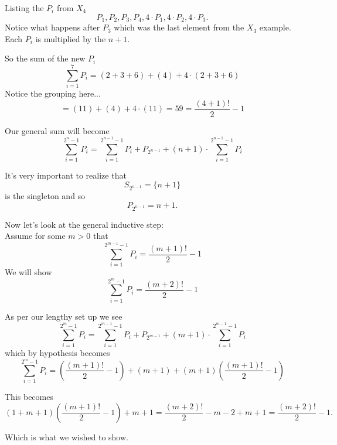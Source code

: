 \documentclass[16 pt]{amsart}
\theoremstyle{definition}
\theoremstyle{remark}
\numberwithin{equation}{section}
\begin{document}
Listing the $P_i$ from $X_4$
\[
P_1,P_2,P_3,P_4,4\cdot P_1, 4\cdot P_2, 4\cdot P_3.
\]
Notice what happens after $P_3$ which was the last element from the $X_3$ example.  Each $P_i$ is multiplied by the $n+1$.

So the sum of the new $P_i$
\[
\sum_{i=1}^{7}P_i = (2+3+6) + (4) + 4\cdot(2+3+6) 
\]
Notice the grouping here...
\[
= (11) + (4) + 4\cdot(11) = 59 = \frac{(4+1)!}{2} -1
\]

Our general sum will become
\[
\sum_{i=1}^{2^n-1}P_i = \sum_{i=1}^{2^{n-1}-1}P_i + P_{2^{n-1}} + (n+1)\cdot \sum_{i=1}^{2^{n-1}-1}P_i
\]

It's very important to realize that
\[
S_{2^{n-1}} = \{n+1\}
\]
is the singleton and so
\[
P_{2^{n-1}} = n+1.
\]

Now let's look at the general inductive step:\\
Assume for some $m>0$ that
\[
\sum_{i=1}^{2^{m-1}-1} P_i = \frac{(m+1)!}{2} - 1
\]
We will show
\[
\sum_{i=1}^{2^{m}-1} P_i = \frac{(m+2)!}{2} - 1
\]

As per our lengthy set up we see
\[
\sum_{i=1}^{2^m-1}P_i = \sum_{i=1}^{2^{m-1}-1}P_i + P_{2^{m-1}} + (m+1)\cdot \sum_{i=1}^{2^{m-1}-1}P_i
\]
which by hypothesis becomes
\[
\sum_{i=1}^{2^m-1}P_i = \left(\frac{(m+1)!}{2}-1\right) + (m+1) + (m+1)\left(\frac{(m+1)!}{2}-1\right)
\]

This becomes
\[
(1+m+1)\left(\frac{(m+1)!}{2}-1\right) + m+1 = \frac{(m+2)!}{2} - m - 2 + m+1= \frac{(m+2)!}{2} - 1.
\]


Which is what we wished to show.
\end{document}
